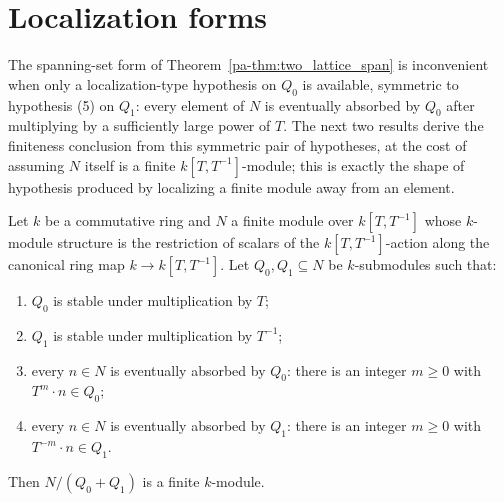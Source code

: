 \section{Localization forms}

The spanning-set form of Theorem~\ref{pa-thm:two_lattice_span} is inconvenient when only a
localization-type hypothesis on \(Q_0\) is available, symmetric to hypothesis (5) on \(Q_1\):
every element of \(N\) is eventually absorbed by \(Q_0\) after multiplying by a sufficiently
large power of \(T\). The next two results derive the finiteness conclusion from this
symmetric pair of hypotheses, at the cost of assuming \(N\) itself is a finite
\(k[T,T^{-1}]\)-module; this is exactly the shape of hypothesis produced by localizing a
finite module away from an element.

\begin{corollary}
  \label{pa-cor:two_lattice_loc}
  \leanok

  Let \(k\) be a commutative ring and \(N\) a finite module over \(k[T,T^{-1}]\) whose
  \(k\)-module structure is the restriction of scalars of the \(k[T,T^{-1}]\)-action along the
  canonical ring map \(k \to k[T,T^{-1}]\). Let \(Q_0, Q_1 \subseteq N\) be \(k\)-submodules
  such that:
  \begin{enumerate}
    \item \(Q_0\) is stable under multiplication by \(T\);
    \item \(Q_1\) is stable under multiplication by \(T^{-1}\);
    \item every \(n \in N\) is eventually absorbed by \(Q_0\): there is an integer \(m \ge 0\)
      with \(T^m \cdot n \in Q_0\);
    \item every \(n \in N\) is eventually absorbed by \(Q_1\): there is an integer \(m \ge 0\)
      with \(T^{-m} \cdot n \in Q_1\).
  \end{enumerate}
  Then \(N / (Q_0 + Q_1)\) is a finite \(k\)-module.
\end{corollary}

